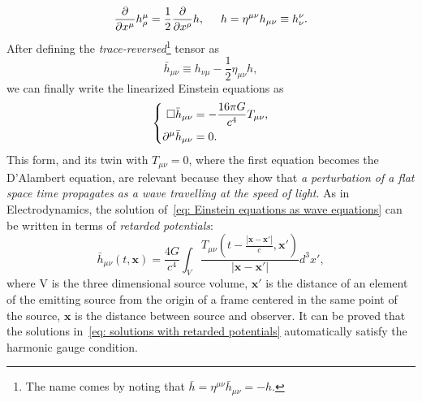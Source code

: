 \begin{equation}
    \frac{\partial}{\partial x^\mu}h^\mu_\rho = \frac{1}{2}\frac
    {\partial}{\partial x^\rho}h, \hspace{5mm} h=\eta^{\mu\nu}h_{\mu\nu}\equiv h^\nu_\nu.
\end{equation}
After defining the \textit{trace-reversed}\footnote{The name comes by noting that $\bar{h}=\eta^{\mu\nu}\bar{h}_{\mu\nu} = -h$.} tensor as
\begin{equation*}
    \bar{h}_{\mu\nu} \equiv h_{\nu\mu} - \frac{1}{2}\eta_{\mu\nu}h,
\end{equation*}
we can finally write the linearized Einstein equations as
\begin{equation}
    \left\{
        \begin{aligned}
            \square\bar{h}_{\mu\nu} &= -\frac{16\pi G}{c^4} T_{\mu\nu}, 
            \notag\\
                \partial^\mu \bar{h}_{\mu\nu} &= 0.
            \end{aligned}
    \right.
    \label{eq: Einstein equations as wave equations}
\end{equation}
This form, and its twin with $T_{\mu\nu}=0$, where the first equation becomes the D'Alambert equation, are relevant because they show that \textit{a perturbation of a flat space time propagates as a wave travelling at the speed of light}.
As in Electrodynamics, the solution of~\eqref{eq: Einstein equations as wave equations} can be written in terms of \textit{retarded potentials}:
\begin{equation}
    \bar{h}_{\mu\nu}(t,\mathbf{x}) = \frac{4G}{c^4}\int_V \frac{T_{\mu\nu}(t - \frac{|\mathbf{x} - \mathbf{x}'|}{c}, \mathbf{x}')}{|\mathbf{x} - \mathbf{x}'|}d^3x',
    \label{eq: solutions with retarded potentials}
\end{equation}
where V is the three dimensional source volume, $\mathbf{x}'$ is the distance of an element of the emitting source from the origin of a frame centered in the same point of the source, $\mathbf{x}$ is the distance between source and observer.
It can be proved that the solutions in~\eqref{eq: solutions with retarded potentials} automatically satisfy the harmonic gauge condition.

